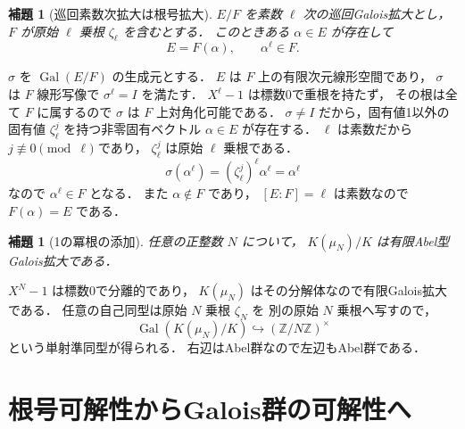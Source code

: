 \documentclass[a5paper,10pt,onecolumn]{jsarticle}
\makeatletter
\theoremstyle{mathnotetheorem}
\newtheorem{lemma}[theorem]{補題}
\renewcommand{\proofname}{証明}
\renewenvironment{proof}[1][\proofname]{%
  \par\pushQED{\qed}\normalfont\topsep4\p@\@plus2\p@\relax
  \trivlist\item[\hskip\labelsep\bfseries #1]\ignorespaces
}{\popQED\endtrivlist\@endpefalse}
\makeatother
\begin{document}
\begin{lemma}[巡回素数次拡大は根号拡大]\label{lem:cyclic-radical}
$E/F$ を素数 $\ell$ 次の巡回Galois拡大とし，
$F$ が原始 $\ell$ 乗根 $\zeta_\ell$ を含むとする．
このときある $\alpha\in E$ が存在して
\[
 E=F(\alpha),\qquad \alpha^\ell\in F.
\]
\end{lemma}
\begin{proof}
$\sigma$ を $\operatorname{Gal}(E/F)$ の生成元とする．
$E$ は $F$ 上の有限次元線形空間であり，
$\sigma$ は $F$ 線形写像で $\sigma^\ell=I$ を満たす．
$X^\ell-1$ は標数0で重根を持たず，
その根は全て $F$ に属するので
$\sigma$ は $F$ 上対角化可能である．
$\sigma\ne I$ だから，固有値1以外の固有値
$\zeta_\ell^j$ を持つ非零固有ベクトル
$\alpha\in E$ が存在する．
$\ell$ は素数だから $j\not\equiv0\pmod\ell$ であり，
$\zeta_\ell^j$ は原始 $\ell$ 乗根である．
\[
 \sigma(\alpha^\ell)
 =(\zeta_\ell^j)^\ell\alpha^\ell=\alpha^\ell
\]
なので $\alpha^\ell\in F$ となる．
また $\alpha\notin F$ であり，
$[E:F]=\ell$ は素数なので
$F(\alpha)=E$ である．
\end{proof}

\begin{lemma}[1の冪根の添加]\label{lem:cyclotomic}
任意の正整数 $N$ について，
$K(\mu_N)/K$ は有限Abel型Galois拡大である．
\end{lemma}
\begin{proof}
$X^N-1$ は標数0で分離的であり，
$K(\mu_N)$ はその分解体なので有限Galois拡大である．
任意の自己同型は原始 $N$ 乗根 $\zeta_N$ を
別の原始 $N$ 乗根へ写すので，
\[
 \operatorname{Gal}(K(\mu_N)/K)
 \hookrightarrow(\mathbb Z/N\mathbb Z)^\times
\]
という単射準同型が得られる．
右辺はAbel群なので左辺もAbel群である．
\end{proof}

\section{根号可解性からGalois群の可解性へ}
\end{document}
